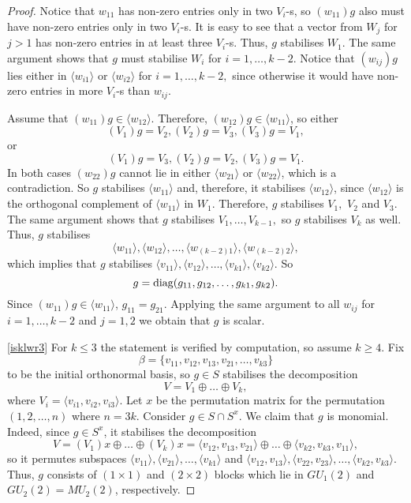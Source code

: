 \begin{proof}
Notice that $w_{11}$ has non-zero entries only in two $V_i$-s, so $(w_{11})g$ also must have non-zero entries only in two $V_i$-s. It is easy to see that a vector from $W_j$ for $j>1$ has non-zero entries  in at least three $V_i$-s. Thus, $g$ stabilises $W_1.$ The same argument shows that $g$ must stabilise $W_i$ for $i=1, \ldots, k-2.$ Notice that $(w_{ij})g$ lies either in $\langle w_{i1} \rangle$ or $\langle w_{i2} \rangle$ for $i=1, \ldots, k-2,$ since otherwise it would have non-zero entries in more $V_i$-s than $w_{ij}$.

Assume that $(w_{11})g \in \langle w_{12}\rangle$. Therefore, $(w_{12})g \in \langle w_{11}\rangle$, so either
 $$(V_1)g=V_2, (V_2)g=V_3, (V_3)g=V_1,$$
 or
 $$(V_1)g=V_3, (V_2)g=V_2, (V_3)g=V_1.$$
In both cases $(w_{22})g$ cannot lie in either  $\langle w_{21} \rangle$ or $\langle w_{22} \rangle$, which is a contradiction. So $g$ stabilises $\langle w_{11} \rangle$ and, therefore, it stabilises $\langle w_{12} \rangle$, since $\langle w_{12} \rangle$ is the orthogonal complement of $\langle w_{11} \rangle$ in $W_1.$ Therefore, $g$ stabilises $V_1,$ $V_2$ and $V_3.$ The same argument shows that $g$
stabilises $V_1, \ldots, V_{k-1},$ so $g$ stabilises $V_k$ as well. Thus, $g$ stabilises $$\langle w_{11} \rangle, \langle w_{12} \rangle, \ldots, \langle w_{(k-2)1} \rangle, \langle w_{(k-2)2} \rangle,$$ which implies that $g$ stabilises   $\langle v_{11} \rangle, \langle v_{12} \rangle, \ldots, \langle v_{k1} \rangle, \langle v_{k2} \rangle$. So $$g=\mathrm{diag}(g_{11}, g_{12}, \ldots, g_{k1}, g_{k2}).$$
Since $(w_{11})g \in \langle w_{11} \rangle$, $g_{11}=g_{21}.$ Applying the same argument to all $w_{ij}$ for $i=1, \ldots, k-2$ and $j= 1,2$ we obtain that $g$ is scalar.

\medskip

\eqref{isklwr3} For $k \le 3$ the statement is verified by computation, so assume $k \ge 4.$ Fix $$\beta=\{v_{11}, v_{12}, v_{13}, v_{21}, \ldots, v_{k3}\}$$ to be the initial orthonormal basis, so $g \in S$ stabilises the decomposition
\begin{equation}\label{dec1}
V=V_1 \oplus \ldots \oplus V_k,
\end{equation}
where $V_i=\langle v_{i1}, v_{i2}, v_{i3} \rangle$.
 Let $x$ be the permutation matrix for the permutation $(1,2, \ldots, n)$ where $n=3k.$ Consider $g \in S \cap S^x$. We claim that $g$ is monomial. Indeed, since $g \in S^x$, it stabilises the decomposition
\begin{equation} \label{dec2}
V=(V_1)x \oplus \ldots \oplus (V_k)x=\langle v_{12}, v_{13}, v_{21} \rangle \oplus \ldots \oplus \langle v_{k2}, v_{k3}, v_{11} \rangle,
\end{equation} 
so it permutes subspaces $\langle v_{11} \rangle, \langle v_{21} \rangle, \ldots, \langle v_{k1} \rangle$ and  $\langle v_{12}, v_{13} \rangle, \langle v_{22}, v_{23} \rangle, \ldots, \langle v_{k2}, v_{k3} \rangle.$ Thus,  $g$ consists of $(1 \times 1)$ and $(2 \times 2)$ blocks which lie in $GU_1(2)$ and $GU_2(2)=MU_2(2)$, respectively. 


\end{proof}
